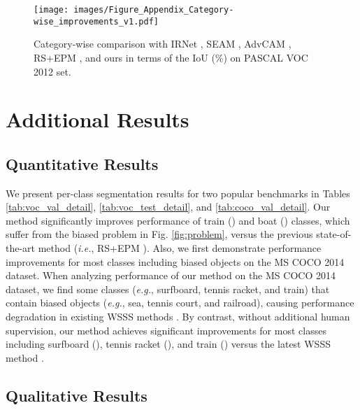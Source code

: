 \documentclass[10pt,twocolumn,letterpaper]{article}
\begin{document}
\begin{figure*}
  \centering
  \texttt{[image: images/Figure\_Appendix\_Category-wise\_improvements\_v1.pdf]}
\caption{
      Category-wise comparison with IRNet \cite{ahn2019weakly}, SEAM \cite{wang2020self}, AdvCAM \cite{lee2021anti}, RS+EPM \cite{jo2022recurseed}, and ours in terms of the IoU (\%) on PASCAL VOC 2012  set. }
  \label{fig:appendix_category}
  \vspace{-0.5cm}
\end{figure*}

\vspace{-0.2cm}

\section{Additional Results}

\subsection{Quantitative Results}





We present per-class segmentation results for two popular benchmarks in Tables \ref{tab:voc_val_detail}, \ref{tab:voc_test_detail}, and \ref{tab:coco_val_detail}. Our method significantly improves performance of train () and boat () classes, which suffer from the biased problem in Fig. \ref{fig:problem}, versus the previous state-of-the-art method (\emph{i.e.}, RS+EPM \cite{jo2022recurseed}). Also, we first demonstrate performance improvements for most classes including biased objects on the MS COCO 2014 dataset. When analyzing performance of our method on the MS COCO 2014 dataset, we find some classes (\emph{e.g.}, surfboard, tennis racket, and train) that contain biased objects (\emph{e.g.}, sea, tennis court, and railroad), causing performance degradation in existing WSSS methods \cite{huang2018weakly, jo2022recurseed}. By contrast, without additional human supervision, our method achieves significant improvements for most classes including surfboard (), tennis racket (), and train () versus the latest WSSS method \cite{jo2022recurseed}. 



\subsection{Qualitative Results}
\end{document}
